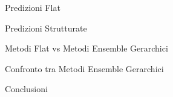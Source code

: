 \documentclass[9pt]{beamer}
\begin{document}
\begin{tframe}{Predizioni Flat}
\end{tframe}

\begin{tframe}{Predizioni Strutturate}
\end{tframe}

\begin{tframe}{Metodi Flat vs Metodi Ensemble Gerarchici}
\end{tframe}

\begin{tframe}{Confronto tra Metodi Ensemble Gerarchici}
\end{tframe}

\begin{tframe}{Conclusioni}
\end{tframe}
\end{document}
